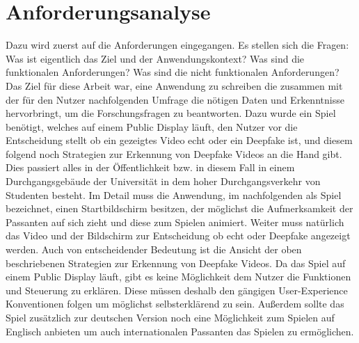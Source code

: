 \section{Anforderungsanalyse}
Dazu wird zuerst auf die Anforderungen eingegangen. 
Es stellen sich die Fragen: Was ist eigentlich das Ziel und der Anwendungskontext? 
Was sind die funktionalen Anforderungen? Was sind die nicht funktionalen Anforderungen?
Das Ziel für diese Arbeit war, eine Anwendung zu schreiben die zusammen mit der für den Nutzer nachfolgenden Umfrage die nötigen Daten und Erkenntnisse hervorbringt, 
um die Forschungsfragen zu beantworten. Dazu wurde ein Spiel benötigt, welches auf einem Public Display läuft, 
den Nutzer vor die Entscheidung stellt ob ein gezeigtes Video echt oder ein Deepfake ist, 
und diesem folgend noch Strategien zur Erkennung von Deepfake Videos an die Hand gibt. 
Dies passiert alles in der Öffentlichkeit bzw. in diesem Fall in einem Durchgangsgebäude der Universität in dem hoher Durchgangsverkehr von Studenten besteht.
Im Detail muss die Anwendung, im nachfolgenden als Spiel bezeichnet, einen Startbildschirm besitzen, der möglichst die Aufmerksamkeit der Passanten auf sich zieht und diese zum Spielen animiert. 
Weiter muss natürlich das Video und der Bildschirm zur Entscheidung ob echt oder Deepfake angezeigt werden. 
Auch von entscheidender Bedeutung ist die Ansicht der oben beschriebenen Strategien zur Erkennung von Deepfake Videos. 
Da das Spiel auf einem Public Display läuft, gibt es keine Möglichkeit dem Nutzer die Funktionen und Steuerung zu erklären. 
Diese müssen deshalb den gängigen User-Experience Konventionen folgen um möglichst selbsterklärend zu sein. 
Außerdem sollte das Spiel zusätzlich zur deutschen Version noch eine Möglichkeit zum Spielen auf Englisch anbieten um auch internationalen Passanten das Spielen zu ermöglichen.

